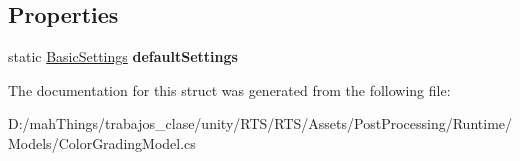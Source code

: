\subsection*{Properties}
\begin{DoxyCompactItemize}
\item 
\mbox{\label{struct_unity_engine_1_1_post_processing_1_1_color_grading_model_1_1_basic_settings_a3c6d62a952263436102ea72c64701adc}} 
static \mbox{\hyperlink{struct_unity_engine_1_1_post_processing_1_1_color_grading_model_1_1_basic_settings}{Basic\+Settings}} {\bfseries default\+Settings}
\end{DoxyCompactItemize}


The documentation for this struct was generated from the following file\+:\begin{DoxyCompactItemize}
\item 
D\+:/mah\+Things/trabajos\+\_\+clase/unity/\+R\+T\+S/\+R\+T\+S/\+Assets/\+Post\+Processing/\+Runtime/\+Models/Color\+Grading\+Model.\+cs\end{DoxyCompactItemize}
